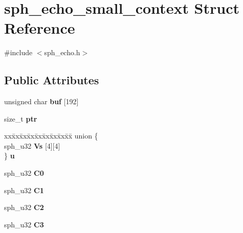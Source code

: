 \hypertarget{structsph__echo__small__context}{}\section{sph\+\_\+echo\+\_\+small\+\_\+context Struct Reference}
\label{structsph__echo__small__context}


{\ttfamily \#include $<$sph\+\_\+echo.\+h$>$}

\subsection*{Public Attributes}
\begin{DoxyCompactItemize}
\item 
\mbox{\label{structsph__echo__small__context_a3f8860cea15c19c4104a04c361d6e0e3}} 
unsigned char {\bfseries buf} \mbox{[}192\mbox{]}
\item 
\mbox{\label{structsph__echo__small__context_a61f2cdfc94d4e1c647f863a273d1867a}} 
size\+\_\+t {\bfseries ptr}
\item 
\mbox{\label{structsph__echo__small__context_a5eb0a7fde75488eac0813731d2a6c94e}} 
\begin{tabbing}
xx\=xx\=xx\=xx\=xx\=xx\=xx\=xx\=xx\=\kill
union \{\\
\>sph\_u32 {\bfseries Vs} \mbox{[}4\mbox{]}\mbox{[}4\mbox{]}\\
\} {\bfseries u}\\

\end{tabbing}\item 
\mbox{\label{structsph__echo__small__context_a007c0c8be672e98a304a2e4bf1e8a216}} 
sph\+\_\+u32 {\bfseries C0}
\item 
\mbox{\label{structsph__echo__small__context_a8d98cb760389f19f02d171d3b139990f}} 
sph\+\_\+u32 {\bfseries C1}
\item 
\mbox{\label{structsph__echo__small__context_a0a123b6140cfd676d780b18bd51eb064}} 
sph\+\_\+u32 {\bfseries C2}
\item 
\mbox{\label{structsph__echo__small__context_a37db2699ca21097fa310489e57ebcfda}} 
sph\+\_\+u32 {\bfseries C3}
\end{DoxyCompactItemize}


